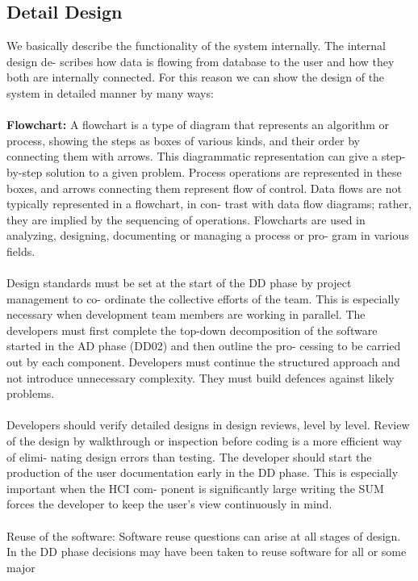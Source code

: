 \subsection{Detail Design}
We basically describe the functionality of the system internally. The internal design de-
scribes how data is flowing from database to the user and how they both are internally
connected. For this reason we can show the design of the system in detailed manner by
many ways:\\\\
\textbf{Flowchart:} A flowchart is a type of diagram that represents an algorithm or process,
showing the steps as boxes of various kinds, and their order by connecting them with
arrows. This diagrammatic representation can give a step-by-step solution to a given
problem. Process operations are represented in these boxes, and arrows connecting them
represent flow of control. Data flows are not typically represented in a flowchart, in con-
trast with data flow diagrams; rather, they are implied by the sequencing of operations.
Flowcharts are used in analyzing, designing, documenting or managing a process or pro-
gram in various fields.\\\\
Design standards must be set at the start of the DD phase by project management to co-
ordinate the collective efforts of the team. This is especially necessary when development
team members are working in parallel. The developers must first complete the top-down
decomposition of the software started in the AD phase (DD02) and then outline the pro-
cessing to be carried out by each component. Developers must continue the structured
approach and not introduce unnecessary complexity. They must build defences against
likely problems.\\\\
Developers should verify detailed designs in design reviews, level by level. Review of
the design by walkthrough or inspection before coding is a more efficient way of elimi-
nating design errors than testing. The developer should start the production of the user
documentation early in the DD phase. This is especially important when the HCI com-
ponent is significantly large writing the SUM forces the developer to keep the user’s view
continuously in mind.\\\\
Reuse of the software: Software reuse questions can arise at all stages of design.
In the DD phase decisions may have been taken to reuse software for all or some major
